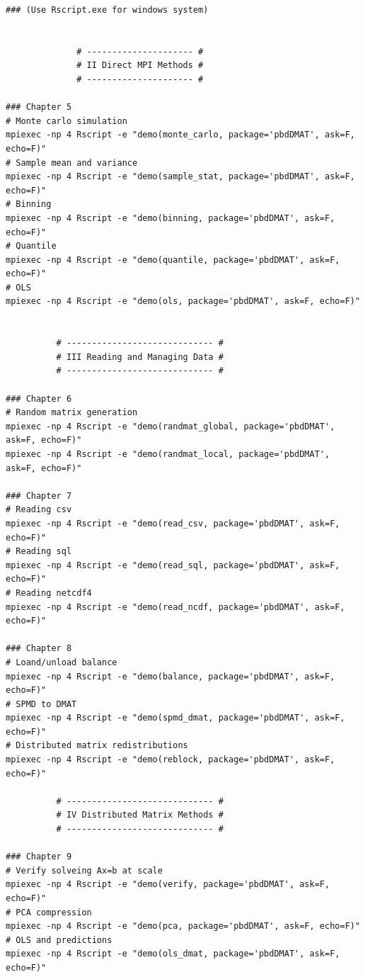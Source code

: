 \begin{lstlisting}[title=Shell Script]
### (Use Rscript.exe for windows system)


		      # --------------------- #
		      # II Direct MPI Methods #
		      # --------------------- #

### Chapter 5
# Monte carlo simulation
mpiexec -np 4 Rscript -e "demo(monte_carlo, package='pbdDMAT', ask=F, echo=F)"
# Sample mean and variance
mpiexec -np 4 Rscript -e "demo(sample_stat, package='pbdDMAT', ask=F, echo=F)"
# Binning
mpiexec -np 4 Rscript -e "demo(binning, package='pbdDMAT', ask=F, echo=F)"
# Quantile
mpiexec -np 4 Rscript -e "demo(quantile, package='pbdDMAT', ask=F, echo=F)"
# OLS
mpiexec -np 4 Rscript -e "demo(ols, package='pbdDMAT', ask=F, echo=F)"


		  # ----------------------------- #
		  # III Reading and Managing Data #
		  # ----------------------------- #

### Chapter 6
# Random matrix generation
mpiexec -np 4 Rscript -e "demo(randmat_global, package='pbdDMAT', ask=F, echo=F)"
mpiexec -np 4 Rscript -e "demo(randmat_local, package='pbdDMAT', ask=F, echo=F)"

### Chapter 7
# Reading csv
mpiexec -np 4 Rscript -e "demo(read_csv, package='pbdDMAT', ask=F, echo=F)"
# Reading sql
mpiexec -np 4 Rscript -e "demo(read_sql, package='pbdDMAT', ask=F, echo=F)"
# Reading netcdf4
mpiexec -np 4 Rscript -e "demo(read_ncdf, package='pbdDMAT', ask=F, echo=F)"

### Chapter 8
# Loand/unload balance
mpiexec -np 4 Rscript -e "demo(balance, package='pbdDMAT', ask=F, echo=F)"
# SPMD to DMAT
mpiexec -np 4 Rscript -e "demo(spmd_dmat, package='pbdDMAT', ask=F, echo=F)"
# Distributed matrix redistributions
mpiexec -np 4 Rscript -e "demo(reblock, package='pbdDMAT', ask=F, echo=F)"

		  # ----------------------------- #
		  # IV Distributed Matrix Methods #
		  # ----------------------------- #

### Chapter 9
# Verify solveing Ax=b at scale
mpiexec -np 4 Rscript -e "demo(verify, package='pbdDMAT', ask=F, echo=F)"
# PCA compression
mpiexec -np 4 Rscript -e "demo(pca, package='pbdDMAT', ask=F, echo=F)"
# OLS and predictions
mpiexec -np 4 Rscript -e "demo(ols_dmat, package='pbdDMAT', ask=F, echo=F)"
\end{lstlisting}